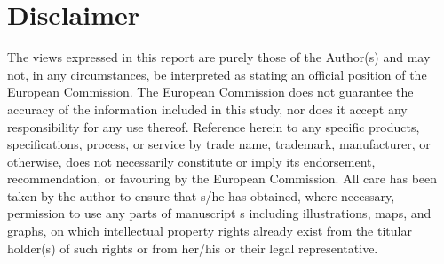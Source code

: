 \section*{Disclaimer}
The views expressed in this report are purely those of the Author(s) and may not, in any circumstances, be interpreted as stating an official position of the European Commission. The European Commission does not guarantee the accuracy of the information included in this study, nor does it accept any responsibility for any use thereof. Reference herein to any specific products, specifications, process, or service by trade name, trademark, manufacturer, or otherwise, does not necessarily constitute or imply its endorsement, recommendation, or favouring by the European Commission. All care has been taken by the author to ensure that s/he has obtained, where necessary, permission to use any parts of manuscript s including illustrations, maps, and graphs, on which intellectual property rights already exist from the titular holder(s) of such rights or from her/his or their legal representative.
